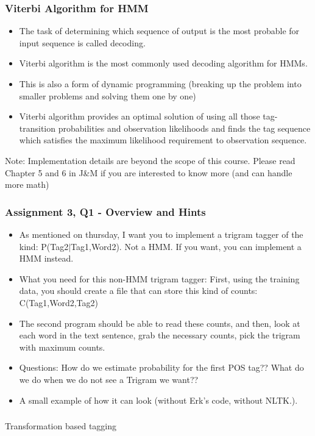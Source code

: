 \documentclass{beamer}
\begin{document}
\begin{frame}
\frametitle{Viterbi Algorithm for HMM }
\begin{itemize}
\item The task of determining which sequence of output is the most probable for input sequence is called decoding.
\item Viterbi algorithm is the most commonly used decoding algorithm for HMMs. 
\item This is also a form of dynamic programming (breaking up the problem into smaller problems and solving them one by one)
\item Viterbi algorithm provides an optimal solution of using all those tag-transition probabilities and observation likelihoods and finds the tag sequence which satisfies the maximum likelihood requirement to observation sequence. 
\end{itemize}
Note: Implementation details are beyond the scope of this course. Please read Chapter 5 and 6 in J\&M if you are interested to know more (and can handle more math)
\end{frame}

\begin{frame}
\frametitle{Assignment 3, Q1 - Overview and Hints}
\begin{itemize}
\item As mentioned on thursday, I want you to implement a trigram tagger of the kind: P(Tag2$|$Tag1,Word2). Not a HMM. If you want, you can implement a HMM instead.
\item What you need for this non-HMM trigram tagger: First, using the training data, you should create a file that can store this kind of counts: C(Tag1,Word2,Tag2)
\item The second program should be able to read these counts, and then, look at each word in the text sentence, grab the necessary counts, pick the trigram with maximum counts. 
\item Questions: How do we estimate probability for the first POS tag?? What do we do when we do not see a Trigram we want?? \pause
\item A small example of how it can look (without Erk's code, without NLTK.). 
\end{itemize}
\end{frame}

\begin{frame}
\frametitle{}
\begin{center}
\Large Transformation based tagging
\end{center}
\end{frame}
\end{document}
